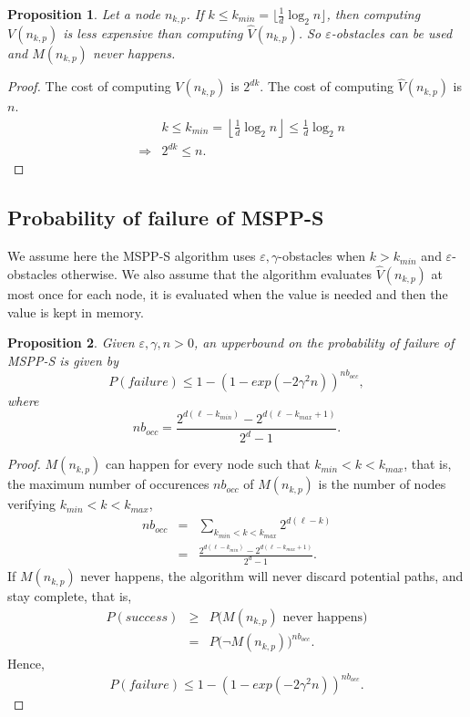 \documentclass[letterpaper, 10 pt, conference]{ieeeconf}
\newtheorem{prop}{Proposition}
\theoremstyle{definition}
\begin{document}
\begin{prop}
Let a node $n_{k,p}$.
If $k \leq k_{min} = \lfloor \frac{1}{d} \log_2 n  \rfloor$, then computing $V(n_{k,p})$ is less expensive than computing $\hat{V}(n_{k,p})$. So $\varepsilon$-obstacles can be used and $M(n_{k,p})$ never happens.
\end{prop}
\begin{proof}
The cost of computing $V(n_{k,p})$ is $2^{dk}$. The cost of computing $\hat{V}(n_{k,p})$ is $n$.
\begin{eqnarray}
&& k \leq k_{min} = \left\lfloor \frac{1}{d} \log_2 n  \right\rfloor \leq \frac{1}{d} \log_2 n \\
&\Rightarrow& 2^{dk} \leq n.
\end{eqnarray}
\end{proof}

\subsection{Probability of failure of MSPP-S}
We assume here the MSPP-S algorithm uses $\varepsilon,\gamma$-obstacles when $k>k_{min}$ and $\varepsilon$-obstacles otherwise.
We also assume that the algorithm evaluates $\hat{V}(n_{k,p})$ at most once for each node, it is evaluated when the value is needed and then the value is kept in memory.
\begin{prop}
Given $\varepsilon,\gamma,n>0$, an upperbound on the probability of failure of MSPP-S is given by
\begin{equation}
P(failure) \leq 1-\left(1-exp(-2\gamma^2 n)\right)^{nb_{occ}},
\end{equation}
where
\begin{equation}
nb_{occ} =\frac{2^{d(\ell-k_{min})}-2^{d(\ell-k_{max}+1)}}{2^d-1}.
\end{equation}
\end{prop}
\begin{proof}
$M(n_{k,p})$ can happen for every node such that $k_{min}< k < k_{max}$, that is, the maximum number of occurences $nb_{occ}$ of $M(n_{k,p})$ is the number of nodes verifying $k_{min}< k < k_{max}$,
\begin{eqnarray}
nb_{occ} &=& \sum_{k_{min}< k < k_{max}} 2^{d(\ell-k)} \\
&=& \frac{2^{d(\ell-k_{min})}-2^{d(\ell-k_{max}+1)}}{2^d-1}.
\end{eqnarray}
If $M(n_{k,p})$ never happens, the algorithm will never discard potential paths, and stay complete, that is,
\begin{eqnarray}
P(success)& \geq & P\big(M(n_{k,p})\text{ never happens}\big) \\
& = & P\big(\neg M(n_{k,p})\big)^{nb_{occ}}.
\end{eqnarray}
Hence,
\begin{equation}
P(failure) \leq 1-\left(1-exp(-2\gamma^2 n)\right)^{nb_{occ}}.
\end{equation}
\end{proof}
\end{document}
